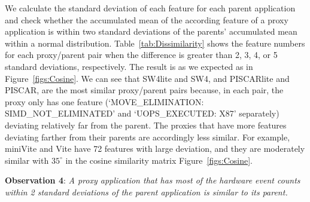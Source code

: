 We calculate the standard deviation of each feature for each parent application and check whether the accumulated mean of the according feature of a proxy application is within two standard deviations of the parents' accumulated mean within a normal distribution. 
Table~\ref{tab:Dissimilarity} shows the feature numbers for each proxy/parent pair when the difference is greater than 2, 3, 4, or 5 standard deviations, respectively. The result is as we expected as in Figure~\ref{figs:Cosine}. We can see that SW4lite and SW4, and PISCARlite and PISCAR, are the most similar proxy/parent pairs because, in each pair, the proxy only has one feature (`MOVE\_ELIMINATION: SIMD\_NOT\_ELIMINATED' and `UOPS\_EXECUTED: X87' separately) deviating relatively far from the parent. The proxies that have more features deviating farther from their parents are accordingly less similar. For example, miniVite and Vite have 72 features with large deviation, and they are moderately similar with $35^\circ$ in the cosine similarity matrix Figure~\ref{figs:Cosine}. \begin{mdframed}
\textbf{Observation 4}: \textit{A proxy application that has most of the hardware event counts within 2 standard deviations of the parent application is similar to its parent.} \end{mdframed}



